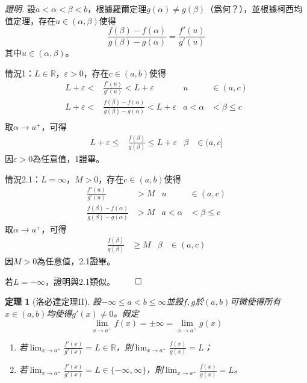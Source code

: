 \documentclass[12pt]{article}
\newtheorem*{theorem}{定理}
\renewenvironment*{proof}{\textit{證明.}}{\hfill$\qed$}
\begin{document}
    \begin{proof}
        設$a<\alpha<\beta<b$，根據羅爾定理$g(\alpha)\neq g(\beta)$（爲何？），並根據柯西均值定理，存在$u\in(\alpha,\beta)$使得$$\frac{f(\beta)-f(\alpha)}{g(\beta)-g(\alpha)}=\frac{f'(u)}{g'(u)}$$其中$u\in(\alpha,\beta)$。

        情況1：$L\in\mathbb{R}$，$\varepsilon>0$，存在$c\in(a,b)$使得\begin{align*}
            L+\varepsilon<&\frac{f'(u)}{g'(u)}<L+\varepsilon & u&\in(a,c)\\
            L+\varepsilon<&\frac{f(\beta)-f(\alpha)}{g(\beta)-g(\alpha)}<L+\varepsilon & a<\alpha&<\beta\leq c\\
        \end{align*}
        取$\alpha\to a^+$，可得\begin{align*}
            L+\varepsilon\leq&\frac{f(\beta)}{g(\beta)}\leq L+\varepsilon & \beta&\in(a,c]
        \end{align*}
        因$\varepsilon>0$為任意值，1證畢。

        情況2.1：$L=\infty$，$M>0$，存在$c\in(a,b)$使得\begin{align*}
            \frac{f'(u)}{g'(u)}&>M & u&\in(a,c)\\
            \frac{f(\beta)-f(\alpha)}{g(\beta)-g(\alpha)}&>M & a<\alpha&<\beta\leq c
        \end{align*}
        取$\alpha\to a^+$，可得\begin{align*}
            \frac{f(\beta)}{g(\beta)}&\geq M & \beta&\in(a,c)
        \end{align*}
        因$M>0$為任意值，2.1證畢。

        若$L=-\infty$，證明與2.1類似。
    \end{proof}

    \begin{theorem}[洛必達定理II]
        設$-\infty\leq a< b\leq \infty$並設$f,g$於$(a,b)$可微使得所有$x\in(a,b)$均使得$g'(x)\neq 0$。假定$$\lim_{x\to a^+}f(x)=\pm\infty=\lim_{x\to a^+}g(x)$$\begin{enumerate}
            \item 若$\displaystyle\lim_{x\to a^+}\frac{f'(x)}{g'(x)}=L\in\mathbb{R}$，則$\displaystyle\lim_{x\to a^+}\frac{f(x)}{g(x)}=L$；
            \item 若$\displaystyle\lim_{x\to a^+}\frac{f'(x)}{g'(x)}=L\in\{-\infty,\infty\}$，則$\displaystyle\lim_{x\to a^+}\frac{f(x)}{g(x)}=L$。
        \end{enumerate}
    \end{theorem}
\end{document}
